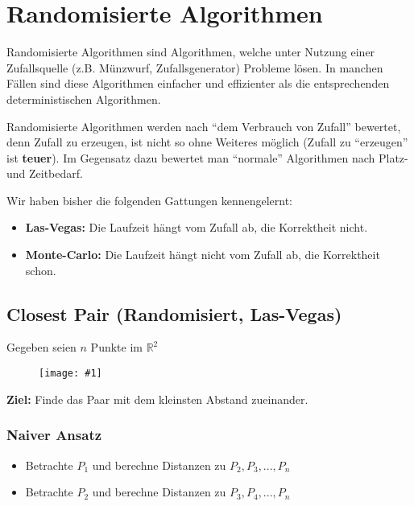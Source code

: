 \documentclass{scrartcl}%
\newcommand{\includepic}[2]{\texttt{[image: \#1]}}
\begin{document}
    \section*{Randomisierte Algorithmen}
    \label{sec:randomisierteAlgorithmen}

    Randomisierte Algorithmen sind Algorithmen,
    welche unter Nutzung einer Zufallsquelle (z.B. Münzwurf, Zufallsgenerator) Probleme lösen.
    In manchen Fällen sind diese Algorithmen einfacher und effizienter
    als die entsprechenden deterministischen Algorithmen.

    Randomisierte Algorithmen werden nach "`dem Verbrauch von Zufall"' bewertet,
    denn Zufall zu erzeugen, ist nicht so ohne Weiteres möglich (Zufall zu "`erzeugen"' ist \textbf{teuer}).
    Im Gegensatz dazu bewertet man "`normale"' Algorithmen nach Platz- und Zeitbedarf.

    Wir haben bisher die folgenden Gattungen kennengelernt:

    \begin{itemize}
        \item \textbf{\textsf{Las-Vegas:}} Die Laufzeit hängt vom Zufall ab, die Korrektheit nicht.
        \item \textbf{\textsf{Monte-Carlo:}} Die Laufzeit hängt nicht vom Zufall ab, die Korrektheit schon.
    \end{itemize}

    \subsection*{Closest Pair (Randomisiert, Las-Vegas)}
    \label{subsec:closestPairrandomisiert,LasVegas}

    Gegeben seien $n$ Punkte im $\mathbb{R}^2$

    \begin{figure}[htb]
        \centering
        \includepic{lec_01_a}{0.25}
        \label{fig:CP_a}
    \end{figure}

    \textbf{\textsf{Ziel:}} Finde das Paar mit dem kleinsten Abstand zueinander.

    \subsubsection*{Naiver Ansatz}
    \label{subsec:naiveransatz}

    \begin{itemize}
        \item Betrachte $P_1$ und berechne Distanzen zu $P_2, P_3, ..., P_n$
        \item Betrachte $P_2$ und berechne Distanzen zu $P_3, P_4, ..., P_n$
    \end{itemize}
\end{document}

